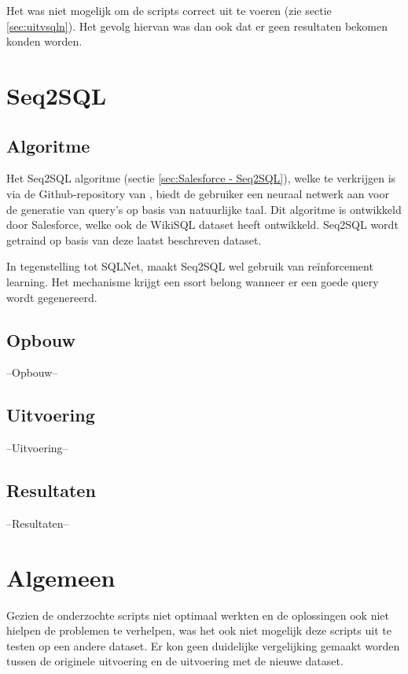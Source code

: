 Het was niet mogelijk om de scripts correct uit te voeren (zie sectie \ref{sec:uitvsqln}). Het gevolg hiervan was dan ook dat er geen resultaten bekomen konden worden. 

\section{Seq2SQL}

\subsection{Algoritme}

Het Seq2SQL algoritme (sectie \ref{sec:Salesforce - Seq2SQL}), welke te verkrijgen is via de Github-repository van \textcite{seq2sql}, biedt de gebruiker een neuraal netwerk aan voor de generatie van query's op basis van natuurlijke taal. Dit algoritme is ontwikkeld door Salesforce, welke ook de WikiSQL dataset heeft ontwikkeld. Seq2SQL wordt getraind op basis van deze laatst beschreven dataset.

In tegenstelling tot SQLNet, maakt Seq2SQL wel gebruik van reïnforcement learning. Het mechanisme krijgt een ssort belong wanneer er een goede query wordt gegenereerd. 

\subsection{Opbouw}

--Opbouw--

\subsection{Uitvoering}

--Uitvoering--

\subsection{Resultaten}

--Resultaten--

\section{Algemeen}

Gezien de onderzochte scripts niet optimaal werkten en de oplossingen ook niet hielpen de problemen te verhelpen, was het ook niet mogelijk deze scripts uit te testen op een andere dataset. Er kon geen duidelijke vergelijking gemaakt worden tussen de originele uitvoering en de uitvoering met de nieuwe dataset.

